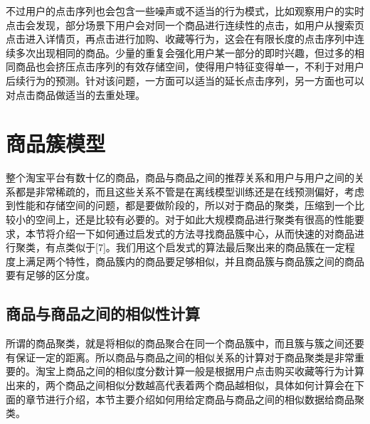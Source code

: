 \par 不过用户的点击序列也会包含一些噪声或不适当的行为模式，比如观察用户的实时点击会发现，部分场景下用户会对同一个商品进行连续性的点击，如用户从搜索页点击进入详情页，再点击进行加购、收藏等行为，这会在有限长度的点击序列中连续多次出现相同的商品。少量的重复会强化用户某一部分的即时兴趣，但过多的相同商品也会挤压点击序列的有效存储空间，使得用户特征变得单一，不利于对用户后续行为的预测。针对该问题，一方面可以适当的延长点击序列，另一方面也可以对点击商品做适当的去重处理。


\section{商品簇模型} 

整个淘宝平台有数十亿的商品，商品与商品之间的推荐关系和用户与用户之间的关系都是非常稀疏的，而且这些关系不管是在离线模型训练还是在线预测偏好，考虑到性能和存储空间的问题，都是要做阶段的，所以对于商品的聚类，压缩到一个比较小的空间上，还是比较有必要的。对于如此大规模商品进行聚类有很高的性能要求，本节将介绍一下如何通过启发式的方法寻找商品簇中心，从而快速的对商品进行聚类，有点类似于[7]。我们用这个启发式的算法最后聚出来的商品簇在一定程度上满足两个特性，商品簇内的商品要足够相似，并且商品簇与商品簇之间的商品要有足够的区分度。

\subsection{商品与商品之间的相似性计算}
所谓的商品聚类，就是将相似的商品聚合在同一个商品簇中，而且簇与簇之间还要有保证一定的距离。所以商品与商品之间的相似关系的计算对于商品聚类是非常重要的。淘宝上商品之间的相似度分数计算一般是根据用户点击购买收藏等行为计算出来的，两个商品之间相似分数越高代表着两个商品越相似，具体如何计算会在下面的章节进行介绍，本节主要介绍如何用给定商品与商品之间的相似数据给商品聚类。

